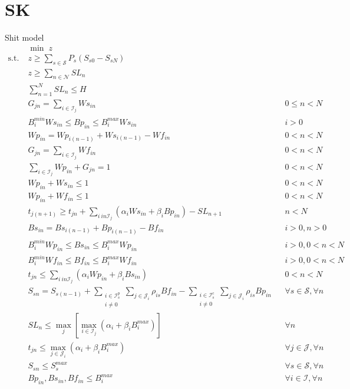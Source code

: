 \section{SK}
Shit model
\begin{align}
&\min \; z &&\\
\text{s.t.}\; &z \ge \sum_{s\in \mathcal{S}} P_s (S_{s0} - S_{sN}) && \\
		  & z \ge \sum_{n\in \mathcal{N}} SL_n  &&\\
		  & \sum_{n=1}^N SL_n \le H &&\\
		  & G_{jn} = \sum_{i \in \mathcal{I}_j} Ws_{in} && 0 \le n < N \\
		  & B_{i}^{min} Ws_{in} \le Bp_{in} \le B_{i}^{max} Ws_{in} && i > 0\\
		  & Wp_{in} = Wp_{i(n-1)} + Ws_{i(n-1)} - Wf_{in} && 0 < n < N \\
		  & G_{jn} = \sum_{i \in \mathcal{I}_j} Wf_{in}  && 0 < n < N \\
		  & \sum_{i \in \mathcal{I}_j} Wp_{in} + G_{jn} = 1 && 0 < n < N \\
		  & Wp_{in}  +Ws_{in} \le 1 && 0 < n < N \\
		  & Wp_{in} + Wf_{in} \le 1 && 0 < n < N \\
		  & t_{j(n+1)} \ge t_{jn} + \sum_{i \ in \mathcal{I}_j} (\alpha_i Ws_{in} + \beta_i Bp_{in}) - SL_{n+1} && n < N \\
		  & Bs_{in} = Bs_{i(n-1)} + Bp_{i(n-1)} - Bf_{in}  && i > 0, n > 0 \\
		  & B_{i}^{min} Wp_{in} \le Bs_{in} \le B_{i}^{max} Wp_{in} && i > 0, 0 < n < N \\
		  & B_{i}^{min} Wf_{in} \le Bf_{in} \le B_{i}^{max} Wf_{in} && i > 0, 0 < n < N \\ 
		  & t_{jn} \le \sum_{i \ in  \mathcal{I}_j} (\alpha_i Wp_{in} + \beta_i Bs_{in})  && 0 < n < N \\
		  & S_{sn} = S_{s(n-1)} + \sum_{\substack{i\in \mathcal{I}_{s}^p\\ i \ne 0}} \sum_{j \in \mathcal{J}_i} \rho_{is} Bf_{in} -   \sum_{\substack{i\in \mathcal{I}_{s}^c\\ i \ne 0}} \sum_{j \in \mathcal{J}_i} \rho_{is} Bp_{in} &&\forall s \in \mathcal{S}, \forall n \\
		  & SL_n \le \max_j \left[\max_{i \in \mathcal{I}_j} (\alpha_i + \beta_i B_{i}^{max}) \right] && \forall n \\
		  & t_{jn} \le \max_{j \in \mathcal{J}_i} (\alpha_i + \beta_i B_{i}^{max}) && \forall j \in \mathcal{J}, \forall n \\
		  & S_{sn} \le S_{s}^{max} && \forall s \in \mathcal{S} , \forall n \\
		  & Bp_{in}, Bs_{in}, Bf_{in} \le B_{i}^{max} && \forall i \in \mathcal{I}, \forall n
\end{align}